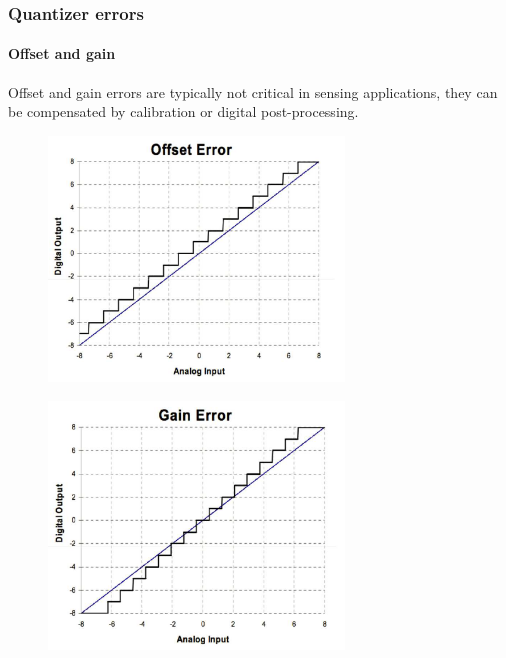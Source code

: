 \subsubsection{Quantizer errors}

\paragraph{Offset and gain}
Offset and gain errors are typically
not critical in sensing
applications, they can be compensated
by calibration or digital post-processing.

\begin{minipage}[l]{0.45 \linewidth}
\begin{figure}[H]
    \centering
    \includegraphics[width =  0.7\textwidth]{L5/img/offset.PNG}
\end{figure}
\end{minipage}\hfill
\begin{minipage}[c]{0.45 \linewidth}
\begin{figure}[H]
    \centering
    \includegraphics[width =  0.7\textwidth]{L5/img/gain.PNG}
\end{figure}
\end{minipage}

